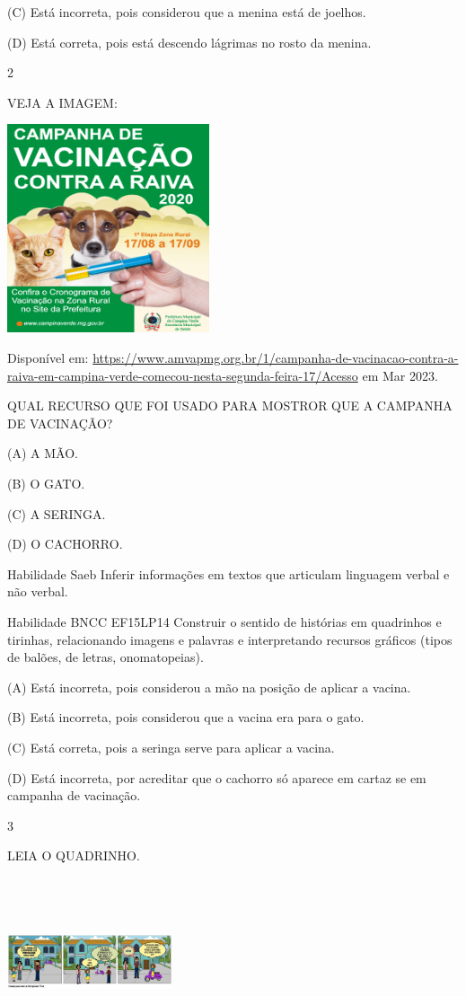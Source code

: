 {{{{{{(C) Está incorreta, pois considerou que a menina está de joelhos.

(D) Está correta, pois está descendo lágrimas no rosto da menina.

\num{2}

VEJA A IMAGEM:

\includegraphics[width=2.34507in,height=2.41801in]{media/image137.png}

Disponível em:
\url{https://www.amvapmg.org.br/1/campanha-de-vacinacao-contra-a-raiva-em-campina-verde-comecou-nesta-segunda-feira-17/Acesso}
em Mar 2023.

QUAL RECURSO QUE FOI USADO PARA MOSTROR QUE A CAMPANHA DE VACINAÇÃO?

(A) A MÃO.

(B) O GATO.

(C) A SERINGA.

(D) O CACHORRO.

Habilidade Saeb Inferir informações em textos que articulam linguagem
verbal e não verbal.

Habilidade BNCC EF15LP14 Construir o sentido de histórias em quadrinhos
e tirinhas, relacionando imagens e palavras e interpretando recursos
gráficos (tipos de balões, de letras, onomatopeias).

(A) Está incorreta, pois considerou a mão na posição de aplicar a
vacina.

(B) Está incorreta, pois considerou que a vacina era para o gato.

(C) Está correta, pois a seringa serve para aplicar a vacina.

(D) Está incorreta, por acreditar que o cachorro só aparece em cartaz se
em campanha de vacinação.

\num{3}

LEIA O QUADRINHO.

\includegraphics[width=1.92014in,height=1.95486in]{media/image138.png}

}}}}}}
